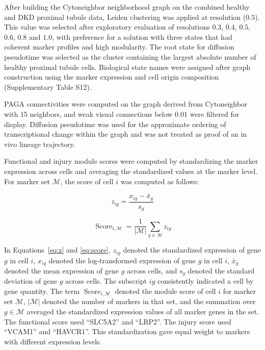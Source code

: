 \documentclass[11pt]{article}
\begin{document}
After building the Cytoneighbor neighborhood graph on the combined healthy and DKD proximal tubule data, Leiden clustering was applied at resolution ($0.5$). This value was selected after exploratory evaluation of resolutions $0.3$, $0.4$, $0.5$, $0.6$, $0.8$ and $1.0$, with preference for a solution with three states that had coherent marker profiles and high modularity. The root state for diffusion pseudotime was selected as the cluster containing the largest absolute number of healthy proximal tubule cells. Biological state names were assigned after graph construction using the marker expression and cell origin composition (Supplementary Table S12).

PAGA connectivities were computed on the graph derived from Cytoneighbor with 15 neighbors, and weak visual connections below $0.01$ were filtered for display. Diffusion pseudotime was used for the approximate ordering of transcriptional change within the graph and was not treated as proof of an in vivo lineage trajectory.

Functional and injury module scores were computed by standardizing the marker expression across cells and averaging the standardized values at the marker level. For marker set $\mathcal{M}$, the score of cell $i$ was computed as follows:

\begin{equation}
z_{ig}=
\frac{x_{ig}-\bar{x}_{g}}
{s_g}
  \label{eq:z}
\end{equation}

\begin{equation}
\operatorname{Score}_{i,\mathcal{M}}=
\frac{1}{|\mathcal{M}|}
\sum_{g\in\mathcal{M}}
z_{ig}
  \label{eq:score}
\end{equation}

In Equations~\ref{eq:z} and \ref{eq:score}, $z_{ig}$ denoted the standardized expression of gene $g$ in cell $i$, $x_{ig}$ denoted the log-transformed expression of gene $g$ in cell $i$, $\bar{x}_{g}$ denoted the mean expression of gene $g$ across cells, and $s_g$ denoted the standard deviation of gene $g$ across cells. The subscript $ig$ consistently indicated a cell by gene quantity. The term \(\operatorname{Score}_{i,\mathcal{M}}\) denoted the module score of cell \(i\) for marker set \(\mathcal{M}\), \(|\mathcal{M}|\) denoted the number of markers in that set, and the summation over \(g\in\mathcal{M}\) averaged the standardized expression values of all marker genes in the set. The functional score used ``SLC5A2'' and ``LRP2''. The injury score used ``VCAM1'' and ``HAVCR1''. This standardization gave equal weight to markers with different expression levels.
\end{document}
